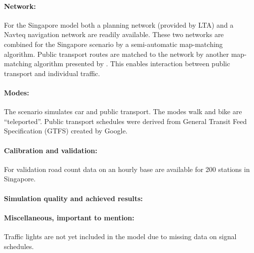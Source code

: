 \paragraph{Network:} 
For the Singapore model both a planning network (provided by LTA) and a Navteq navigation network are readily available. These two networks are combined for the Singapore scenario by a semi-automatic map-matching algorithm. Public transport routes are matched to the network by another map-matching algorithm presented by \citet[][]{Ordonez_HKSTS_2011, Ordonez_Webpage_2011_4}. This enables interaction between public transport and individual traffic.

\paragraph{Modes:} 
The scenario simulates car and public transport. The modes walk and bike are ``teleported''. Public transport schedules were derived from General Transit Feed Specification (GTFS) created by Google.

\paragraph{Calibration and validation:}
For validation road count data on an hourly base are available for 200 stations in Singapore.

\paragraph{Simulation quality and achieved results:}

\paragraph{Miscellaneous, important to mention:}
Traffic lights are not yet included in the model due to missing data on signal schedules.
